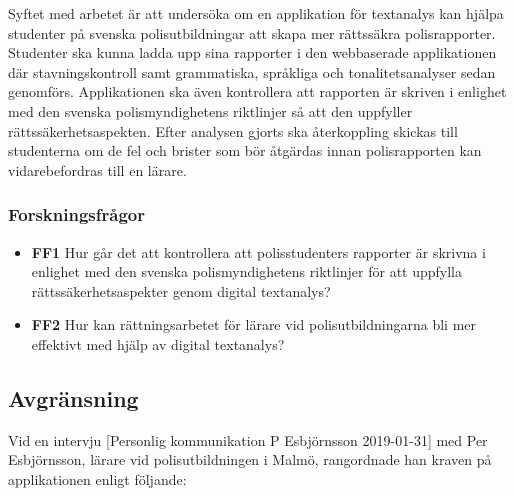 \documentclass[swedish]{maucsthesis}
\begin{document}
Syftet med arbetet är att undersöka om en applikation för textanalys kan
hjälpa studenter på svenska polisutbildningar att skapa mer rättssäkra
polisrapporter. Studenter ska kunna ladda upp sina rapporter i den webbaserade
applikationen där stavningskontroll samt grammatiska, språkliga och
tonalitetsanalyser sedan genomförs. Applikationen ska även kontrollera att rapporten
är skriven i enlighet med den svenska polismyndighetens riktlinjer så att den
uppfyller rättssäkerhetsaspekten. Efter analysen gjorts ska
återkoppling skickas till studenterna om de fel och brister som bör åtgärdas innan
polisrapporten kan vidarebefordras till en lärare.

\subsubsection{Forskningsfrågor}

\begin{itemize}
\item \textbf{FF1} Hur går det att kontrollera att polisstudenters rapporter är skrivna i enlighet med den svenska polismyndighetens riktlinjer för att uppfylla rättssäkerhetsaspekter genom digital textanalys?
\item \textbf{FF2} Hur kan rättningsarbetet för lärare vid polisutbildningarna bli mer
  effektivt med hjälp av digital textanalys?
\end{itemize}

\subsection{Avgränsning}\label{avgränsning}

Vid en intervju [Personlig kommunikation P Esbjörnsson 2019-01-31] med Per Esbjörnsson, lärare vid polisutbildningen i Malmö, rangordnade han kraven på applikationen enligt följande:
\end{document}
